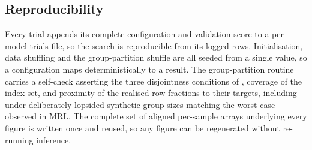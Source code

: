 \FloatBarrier

\subsection{Reproducibility}

Every trial appends its complete configuration and validation score to a per-model trials file, so the search is reproducible from its logged rows. Initialisation, data shuffling and the group-partition shuffle are all seeded from a single value, so a configuration maps deterministically to a result. The group-partition routine carries a self-check asserting the three disjointness conditions of , coverage of the index set, and proximity of the realised row fractions to their targets, including under deliberately lopsided synthetic group sizes matching the worst case observed in MRL. The complete set of aligned per-sample arrays underlying every figure is written once and reused, so any figure can be regenerated without re-running inference.
